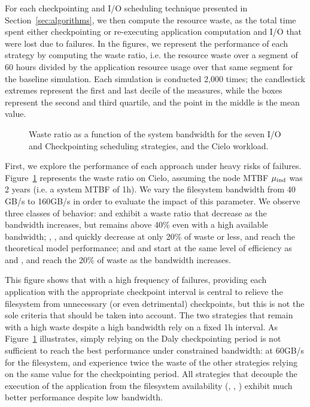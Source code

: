 For each checkpointing and I/O scheduling technique presented in
Section~\ref{sec:algorithms}, we then compute the resource waste, as
the total time spent either checkpointing or re-executing application
computation and I/O that were lost due to failures. In the figures, we
represent the performance of each strategy by computing the waste
ratio, i.e. the resource waste over a segment of 60 hours divided by
the application resource usage over that same segment for the baseline
simulation. Each simulation is conducted 2,000 times; the candlestick
extremes represent the first and last decile of the measures, while
the boxes represent the second and third quartile, and the point in
the middle is the mean value.

\begin{figure}
  \begin{center}
    \resizebox{\linewidth}{!}{}
  \end{center}
  \caption{Waste ratio as a function of the system bandwidth for the
    seven I/O and Checkpointing scheduling strategies, and the Cielo
    workload. \label{fig:cielo-1hmtbf}}
\end{figure}

First, we explore the performance of each approach under heavy risks
of failures. Figure~\ref{fig:cielo-1hmtbf} represents the waste ratio
on Cielo, assuming the node MTBF $\mu_{\text{ind}}$ was 2 years (i.e. a system MTBF of
1h). We vary the filesystem bandwidth from 40 GB/s to 160GB/s in order
to evaluate the impact of this parameter. We observe three classes of
behavior: \propfixed and \bfifofixed exhibit a waste ratio that
decrease as the bandwidth increases, but remains above 40\% even with
a high available bandwidth; \fifodaly, \fifofixed, and \cooperative
quickly decrease at only 20\% of waste or less, and reach the
theoretical model performance; and \propdaly and \bfifodaly start at
the same level of efficiency as \propfixed and \bfifofixed, and reach
the 20\% of waste as the bandwidth increases.

This figure shows that with a high frequency of failures, providing
each application with the appropriate checkpoint interval is central
to relieve the filesystem from unnecessary (or even detrimental)
checkpoints, but this is not the sole criteria that should be taken
into account. The two strategies that remain with a high waste despite
a high bandwidth rely on a fixed 1h interval. As Figure~\ref{fig:cielo-1hmtbf} 
illustrates, simply relying on the Daly checkpointing period is not
sufficient to reach the best performance under constrained bandwidth:
at 60GB/s for the filesystem, \propdaly and \bfifodaly experience
twice the waste of the other strategies relying on the same value for
the checkpointing period. All strategies that decouple the execution
of the application from the filesystem availability (\fifodaly,
\fifofixed, \cooperative) exhibit much better performance despite low
bandwidth.

